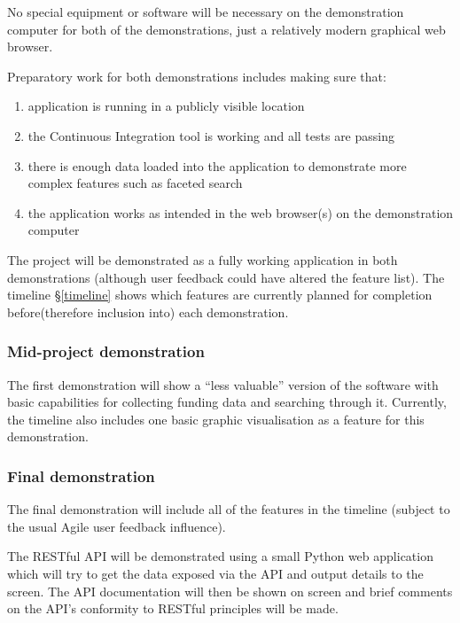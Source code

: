 \documentclass[11pt,fleqn,twoside]{article}
\begin{document}
No special equipment or software will be necessary on the demonstration computer for both of the demonstrations, just a relatively modern graphical web browser.

Preparatory work for both demonstrations includes making sure that:
\begin{enumerate}
	\item application is running in a publicly visible location
	\item the Continuous Integration tool is working and all tests are passing
	\item there is enough data loaded into the application to demonstrate more complex features such as faceted search \cite{faceted}
	\item the application works as intended in the web browser(s) on the demonstration computer
\end{enumerate}

The project will be demonstrated as a fully working application in both demonstrations (although user feedback could have altered the feature list). The timeline \S\ref{timeline} shows which features are currently planned for completion before(therefore inclusion into) each demonstration.

\subsubsection{Mid-project demonstration}
The first demonstration will show a ``less valuable'' version of the software with basic capabilities for collecting funding data and searching through it. Currently, the timeline also includes one basic graphic visualisation as a feature for this demonstration.

\subsubsection{Final demonstration}
The final demonstration will include all of the features in the timeline (subject to the usual Agile user feedback influence).

The RESTful API will be demonstrated using a small Python web application which will try to get the data exposed via the API and output details to the screen. The API documentation will then be shown on screen and brief comments on the API's conformity to RESTful principles will be made.

\end{document}
